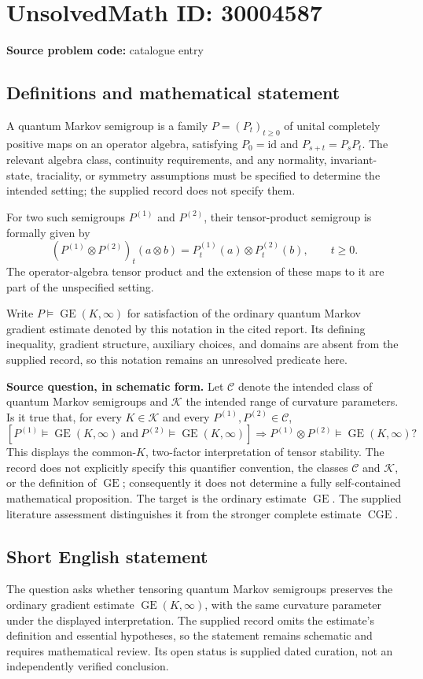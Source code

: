 \documentclass[11pt]{article}
\begin{document}
\section*{UnsolvedMath ID: 30004587}
\textbf{Source problem code:} catalogue entry
\subsection{Definitions and mathematical statement}
A quantum Markov semigroup is a family \(P=(P_t)_{t\geq 0}\) of unital completely positive maps on an operator algebra, satisfying \(P_0=\mathrm{id}\) and \(P_{s+t}=P_sP_t\). The relevant algebra class, continuity requirements, and any normality, invariant-state, traciality, or symmetry assumptions must be specified to determine the intended setting; the supplied record does not specify them.

For two such semigroups \(P^{(1)}\) and \(P^{(2)}\), their tensor-product semigroup is formally given by
\[
(P^{(1)}\otimes P^{(2)})_t(a\otimes b)
   =P^{(1)}_t(a)\otimes P^{(2)}_t(b),\qquad t\geq0.
\]
The operator-algebra tensor product and the extension of these maps to it are part of the unspecified setting.

Write \(P\models\operatorname{GE}(K,\infty)\) for satisfaction of the ordinary quantum Markov gradient estimate denoted by this notation in the cited report. Its defining inequality, gradient structure, auxiliary choices, and domains are absent from the supplied record, so this notation remains an unresolved predicate here.

\textbf{Source question, in schematic form.} Let \(\mathcal C\) denote the intended class of quantum Markov semigroups and \(\mathcal K\) the intended range of curvature parameters. Is it true that, for every \(K\in\mathcal K\) and every \(P^{(1)},P^{(2)}\in\mathcal C\),
\[
\left[
 P^{(1)}\models\operatorname{GE}(K,\infty)
 \ \text{and}\ 
 P^{(2)}\models\operatorname{GE}(K,\infty)
\right]
\Longrightarrow
P^{(1)}\otimes P^{(2)}\models\operatorname{GE}(K,\infty)?
\]
This displays the common-\(K\), two-factor interpretation of tensor stability. The record does not explicitly specify this quantifier convention, the classes \(\mathcal C\) and \(\mathcal K\), or the definition of \(\operatorname{GE}\); consequently it does not determine a fully self-contained mathematical proposition. The target is the ordinary estimate \(\operatorname{GE}\). The supplied literature assessment distinguishes it from the stronger complete estimate \(\operatorname{CGE}\).
\subsection{Short English statement}
The question asks whether tensoring quantum Markov semigroups preserves the ordinary gradient estimate \(\operatorname{GE}(K,\infty)\), with the same curvature parameter under the displayed interpretation. The supplied record omits the estimate's definition and essential hypotheses, so the statement remains schematic and requires mathematical review. Its open status is supplied dated curation, not an independently verified conclusion.
\end{document}

